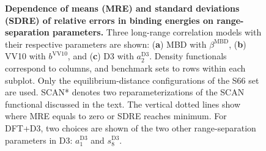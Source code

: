 \begin{figure}[t]
{
}
\caption{\textbf{Dependence of means (MRE) and standard deviations (SDRE) of relative errors in binding energies on range-separation parameters.}
Three long-range correlation models with their respective parameters are shown: (\textbf a) MBD with $\beta^\text{MBD}$, (\textbf b) VV10 with $b^\text{VV10}$, and (\textbf c) D3 with $a_2^\text{D3}$.
Density functionals correspond to columns, and benchmark sets to rows within each subplot.
Only the equilibrium-distance configurations of the S66 set are used.
SCAN* denotes two reparameterizations of the SCAN functional discussed in the text. %
The vertical dotted lines show where MRE equals to zero or SDRE reaches minimum.
For DFT+D3, two choices are shown of the two other range-separation parameters in D3: $a_1^\text{D3}$ and $s_8^\text{D3}$.
}\label{fig:param-fitting}
\end{figure}

